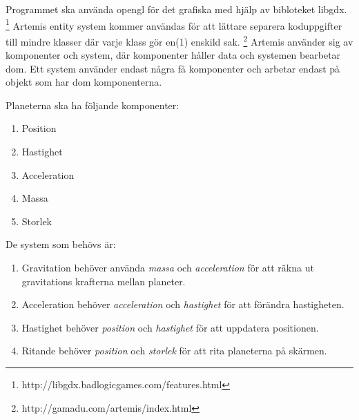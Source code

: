 Programmet ska använda opengl för det grafiska med hjälp av bibloteket libgdx. \footnote{http://libgdx.badlogicgames.com/features.html}
Artemis entity system kommer användas för att lättare separera koduppgifter till mindre klasser där varje klass gör en(1) enskild sak. \footnote{http://gamadu.com/artemis/index.html}
Artemis använder sig av komponenter och system, där komponenter håller data och systemen bearbetar dom. Ett system använder endast några få komponenter och arbetar endast på objekt som har dom komponenterna.

Planeterna ska ha följande komponenter:
\begin{enumerate}
    \item Position
    \item Hastighet
    \item Acceleration
    \item Massa
    \item Storlek
\end{enumerate}
De system som behövs är:
\begin{enumerate}
\item Gravitation behöver använda \textit{massa} och \textit{acceleration} för att räkna ut gravitations krafterna mellan planeter.
\item Acceleration behöver \textit{acceleration} och \textit{hastighet} för att förändra hastigheten.
\item Hastighet behöver \textit{position} och \textit{hastighet} för att uppdatera positionen.
\item Ritande behöver \textit{position} och \textit{storlek} för att rita planeterna på skärmen.
\end{enumerate}
